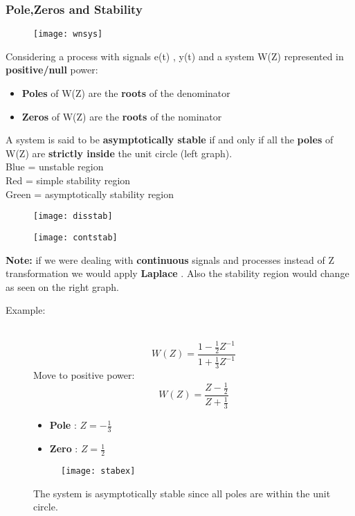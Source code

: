 \subsubsection{Pole,Zeros and Stability}
\begin{figure}[!h]
 \centering
  \texttt{[image: wnsys]}
\end{figure}
Considering a process with signals e(t) , y(t) and a system W(Z) represented in \textbf{positive/null} power: 
\begin{itemize}
\item \textbf{Poles} of W(Z) are the \textbf{roots} of the denominator
\item \textbf{Zeros} of W(Z) are the \textbf{roots} of the nominator
\end{itemize}
A system is said to be \textbf{asymptotically stable} if and only if all the \textbf{poles} of W(Z) are \textbf{strictly inside} the unit circle (left graph).\\
Blue = unstable region \\
Red = simple stability region \\
Green = asymptotically stability region \\
\begin{figure}[H]
\begin{minipage}{.5\textwidth}
 \centering
  \texttt{[image: disstab]}
\end{minipage}%
	\begin{minipage}{.5\textwidth}
  \centering
  \texttt{[image: contstab]}
\end{minipage}%
\end{figure}
\textbf{Note:} if we were dealing with \textbf{continuous} signals and processes instead of Z transformation we would apply \textbf{Laplace} . Also the stability region would change as seen on the right graph.
\newpage
\begin{description}
\item[Example:]\hfill\\
$$ W(Z) = \frac{1-\frac{1}{2}Z^{-1}}{1+\frac{1}{3}Z^{-1}} $$ 
Move to positive power:
$$ W(Z) = \frac{Z-\frac{1}{2}}{Z+\frac{1}{3}} $$ 
\begin{itemize}
\item \textbf{Pole} : $ Z = -\frac{1}{3} $
\item \textbf{Zero} : $ Z = \frac{1}{2} $
\end{itemize}
\begin{figure}[!h]
 \centering
  \texttt{[image: stabex]}
\end{figure}
The system is asymptotically stable since all poles are within the unit circle.
\end{description}

